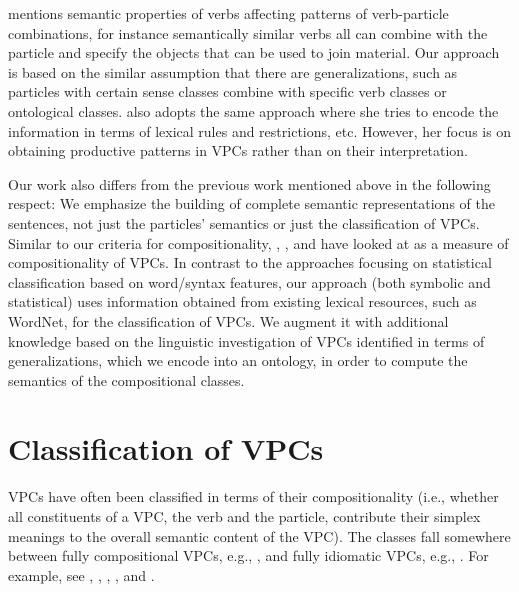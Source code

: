 \documentclass[output=paper,modfonts,nonflat]{langsci/langscibook}
\begin{document}
\citet{Fra76} mentions semantic properties of verbs affecting patterns of verb-particle combinations, for instance semantically similar verbs  all can combine with the particle  and specify the objects that can be used to join material. Our approach is based on the similar assumption that there are generalizations, such as particles with certain sense classes combine with specific verb classes or ontological classes. \citet{Vil03} also adopts the same approach where she tries to encode the information in terms of lexical rules and restrictions, etc. However, her focus is on obtaining productive patterns in VPCs rather than on their interpretation.

Our work also differs from the previous work mentioned above in the following respect: We emphasize the building of complete semantic representations of the sentences, not just the particles' semantics or just the classification of VPCs. Similar to our criteria for compositionality, \citet{McC03}, \citet{Bal03}, and \citet{Ban03} have looked at  as a measure of compositionality of VPCs. In contrast to the approaches focusing on statistical classification based on word/syntax features, our approach (both symbolic and statistical) uses information obtained from existing lexical resources, such as WordNet, for the classification of VPCs. We augment it with additional knowledge based on the linguistic investigation of VPCs identified in terms of generalizations, which we encode into an ontology, in order to compute the semantics of the compositional classes.


\section{Classification of VPCs} \label{sec:classification}

VPCs have often been classified in terms of their compositionality (i.e., whether all constituents of a VPC, the verb and the particle, contribute their simplex meanings to the overall semantic content of the VPC). The classes fall somewhere between fully compositional VPCs, e.g., , and fully idiomatic VPCs, e.g., . For example, see \citet{Fra76}, \citet{Che86}, \citet{Odo98}, \citet{Deh02}, and \citet{Jac02}.
\end{document}
